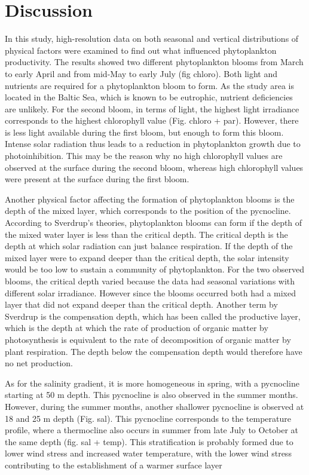 \documentclass[../Main.tex]{subfiles}
\begin{document}
\section*{\crule[blue]{.3cm}{.3cm} Discussion}
In this study, high-resolution data on both seasonal and vertical distributions of physical factors were examined to find out what influenced phytoplankton productivity. The results showed two different phytoplankton blooms from March to early April and from mid-May to early July (fig chloro). 
Both light and nutrients are required for a phytoplankton bloom to form\supercite{munkes2021cyanobacteria}. 
As the study area is located in the Baltic Sea, which is known to be eutrophic, nutrient deficiencies are unlikely\supercite{munkes2021cyanobacteria}. 
For the second bloom, in terms of light, the highest light irradiance corresponds to the highest chlorophyll value (Fig. chloro + par). However, there is less light available during the first bloom, but enough to form this bloom. Intense solar radiation thus leads to a reduction in phytoplankton growth due to photoinhibition\supercite{edwards2016phytoplankton}. 
This may be the reason why no high chlorophyll values are observed at the surface during the second bloom, whereas high chlorophyll values were present at the surface during the first bloom.  

Another physical factor affecting the formation of phytoplankton blooms is the depth of the mixed layer, which corresponds to the position of the pycnocline. 
According to Sverdrup's theories, phytoplankton blooms can form if the depth of the mixed water layer is less than the critical depth\supercite{Sverdrup1953OnCF}. 
The critical depth is the depth at which solar radiation can just balance respiration. If the depth of the mixed layer were to expand deeper than the critical depth, the solar intensity would be too low to sustain a community of phytoplankton. 
For the two observed blooms, the critical depth varied because the data had seasonal variations with different solar irradiance. 
However since the blooms occurred both had a mixed layer that did not expand deeper than the critical depth. Another term by Sverdrup is the compensation depth, which has been called the productive layer, which is the depth at which the rate of production of organic matter by photosynthesis is equivalent to the rate of decomposition of organic matter by plant respiration\supercite{Sverdrup1953OnCF}. 
The depth below the compensation depth would therefore have no net production. 

As for the salinity gradient, it is more homogeneous in spring, with a pycnocline starting at 50 m depth. This pycnocline is also observed in the summer months. However, during the summer months, another shallower pycnocline is observed at 18 and 25 m depth (Fig. sal). This pycnocline corresponds to the temperature profile, where a thermocline also occurs in summer from late July to October at the same depth (fig. sal + temp). This stratification is probably formed due to lower wind stress and increased water temperature, with the lower wind stress contributing to the establishment of a warmer surface layer%
\end{document}
